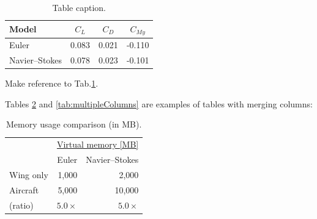 \begin{table}[!htb]
  \caption[Table caption shown in TOC.]{Table caption.}
  \label{tab:aeroCoeff}
  \renewcommand{\arraystretch}{1.2} %
  \centering
  \begin{tabular}{lccc}
    \toprule
    Model           & $C_L$ & $C_D$ & $C_{M y}$ \\
    \midrule
    Euler           & 0.083 & 0.021 & -0.110    \\
    Navier--Stokes  & 0.078 & 0.023 & -0.101    \\
    \bottomrule
  \end{tabular}
\end{table}

Make reference to Tab.\ref{tab:aeroCoeff}.

Tables \ref{tab:memory} and \ref{tab:multipleColumns} are examples of tables with merging columns:

\begin{table}[!htb]
  \caption{Memory usage comparison (in MB).}
  \label{tab:memory}
  \renewcommand{\arraystretch}{1.2} %
  \centering
  \begin{tabular}[]{lrr}
    \toprule
                & \multicolumn{2}{c}{\underline{Virtual memory [MB]}} \\
                & Euler       & Navier--Stokes \\
    \midrule
      Wing only &  1,000      &    2,000       \\
      Aircraft  &  5,000      &   10,000       \\
      (ratio)   & $5.0\times$ & $5.0\times$    \\
    \bottomrule
  \end{tabular}
\end{table}

